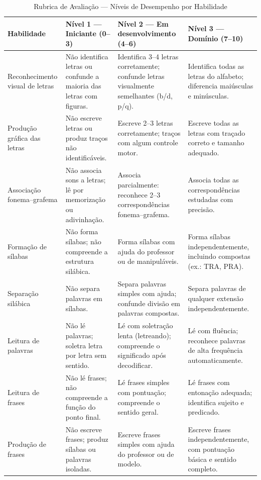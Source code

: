 \begin{table}[h]
\centering
\caption{Rubrica de Avaliação — N\'{i}veis de Desempenho por Habilidade}
\label{tab:rubrica}
\renewcommand{\arraystretch}{1.3}
\begin{tabular}{|p{3cm}|p{3.5cm}|p{3.5cm}|p{3.5cm}|}
\hline
\textbf{Habilidade} &
\textbf{N\'{i}vel 1 — Iniciante (0--3)} &
\textbf{N\'{i}vel 2 — Em desenvolvimento (4--6)} &
\textbf{N\'{i}vel 3 — Dom\'{i}nio (7--10)} \\
\hline
Reconhecimento visual de letras &
N\~{a}o identifica letras ou confunde a maioria das letras com
figuras. &
Identifica 3--4 letras corretamente; confunde letras visualmente
semelhantes (b/d, p/q). &
Identifica todas as letras do alfabeto; diferencia maiúsculas e
minúsculas. \\
\hline
Produ\c{c}\~{a}o gr\'{a}fica das letras &
N\~{a}o escreve letras ou produz tra\c{c}os
n\~{a}o identific\'{a}veis. &
Escreve 2--3 letras corretamente; tra\c{c}os com algum
controle motor. &
Escreve todas as letras com tra\c{c}ado correto e
tamanho adequado. \\
\hline
Associa\c{c}\~{a}o fonema--grafema &
N\~{a}o associa sons a letras; lê por
memoriza\c{c}\~{a}o ou adivinha\c{c}\~{a}o. &
Associa parcialmente: reconhece 2--3
correspond\^{e}ncias fonema--grafema. &
Associa todas as correspond\^{e}ncias estudadas com
precis\~{a}o. \\
\hline
Forma\c{c}\~{a}o de s\'{i}labas &
N\~{a}o forma s\'{i}labas; n\~{a}o compreende a
estrutura sil\'{a}bica. &
Forma s\'{i}labas com ajuda do professor ou
de manipul\'{a}veis. &
Forma s\'{i}labas independentemente, incluindo
compostas (ex.: TRA, PRA). \\
\hline
Separa\c{c}\~{a}o sil\'{a}bica &
N\~{a}o separa palavras em s\'{i}labas. &
Separa palavras simples com ajuda;
confunde divis\~{a}o em palavras compostas. &
Separa palavras de qualquer extens\~{a}o
independentemente. \\
\hline
Leitura de palavras &
N\~{a}o l\'{e} palavras; soletra letra por
letra sem sentido. &
L\'{e} com soletra\c{c}\~{a}o lenta (letreando);
compreende o significado ap\'{o}s decodificar. &
L\'{e} com flu\^{e}ncia; reconhece palavras de
alta frequ\^{e}ncia automaticamente. \\
\hline
Leitura de frases &
N\~{a}o l\'{e} frases; n\~{a}o compreende a
fun\c{c}\~{a}o do ponto final. &
L\'{e} frases simples com pontuação; compreende
o sentido geral. &
L\'{e} frases com entona\c{c}\~{a}o adequada;
identifica sujeito e predicado. \\
\hline
Produ\c{c}\~{a}o de frases &
N\~{a}o escreve frases; produz s\'{i}labas ou
palavras isoladas. &
Escreve frases simples com ajuda do professor
ou de modelo. &
Escreve frases independentemente, com pontua\c{c}\~{a}o
b\'{a}sica e sentido completo. \\
\hline
\end{tabular}
\end{table}

